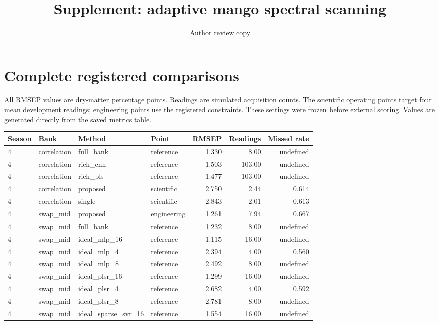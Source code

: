 \documentclass[10pt,a4paper]{article}
\begin{document}
\title{Supplement: adaptive mango spectral scanning}\author{Author review copy}\date{}\maketitle
\section{Complete registered comparisons}
All RMSEP values are dry-matter percentage points. Readings are simulated acquisition counts.
The scientific operating points target four mean development readings; engineering points use the registered constraints.
These settings were frozen before external scoring. Values are generated directly from the saved metrics table.
\begin{landscape}\scriptsize
\begin{longtable}{llllrrr}
\toprule
Season & Bank & Method & Point & RMSEP & Readings & Missed rate \\
\midrule
4 & correlation & full\_bank & reference & 1.330 & 8.00 & undefined \\
4 & correlation & rich\_cnn & reference & 1.503 & 103.00 & undefined \\
4 & correlation & rich\_pls & reference & 1.477 & 103.00 & undefined \\
4 & correlation & proposed & scientific & 2.750 & 2.44 & 0.614 \\
4 & correlation & single & scientific & 2.843 & 2.01 & 0.613 \\
4 & swap\_mid & proposed & engineering & 1.261 & 7.94 & 0.667 \\
4 & swap\_mid & full\_bank & reference & 1.232 & 8.00 & undefined \\
4 & swap\_mid & ideal\_mlp\_16 & reference & 1.115 & 16.00 & undefined \\
4 & swap\_mid & ideal\_mlp\_4 & reference & 2.394 & 4.00 & 0.560 \\
4 & swap\_mid & ideal\_mlp\_8 & reference & 2.492 & 8.00 & undefined \\
4 & swap\_mid & ideal\_plsr\_16 & reference & 1.299 & 16.00 & undefined \\
4 & swap\_mid & ideal\_plsr\_4 & reference & 2.682 & 4.00 & 0.592 \\
4 & swap\_mid & ideal\_plsr\_8 & reference & 2.781 & 8.00 & undefined \\
4 & swap\_mid & ideal\_sparse\_svr\_16 & reference & 1.554 & 16.00 & undefined \\

\end{longtable}
\end{landscape}
\end{document}
